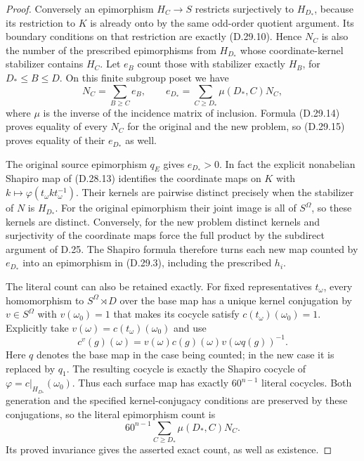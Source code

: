 \begin{proof}
Conversely an epimorphism $H_C\to S$ restricts
surjectively to $H_{D_*}$, because its restriction
to $K$ is already onto by the same odd-order
quotient argument.  Its boundary conditions on
that restriction are exactly
\textup{(D.29.10)}.  Hence $N_C$ is also the
number of the prescribed epimorphisms from
$H_{D_*}$ whose coordinate-kernel stabilizer
contains $H_C$.
Let $e_B$ count those with stabilizer exactly
$H_B$, for $D_*\leq B\leq D$.
On this finite subgroup poset we have
\[
 N_C=\sum_{B\geq C}e_B,\qquad
 e_{D_*}=\sum_{C\geq D_*}\mu(D_*,C)N_C,
 \tag{D.29.15}
\]
where $\mu$ is the inverse of the incidence matrix
of inclusion.  Formula \textup{(D.29.14)} proves
equality of every $N_C$ for the original and the
new problem, so \textup{(D.29.15)} proves equality
of their $e_{D_*}$ as well.

The original source epimorphism $q_E$ gives
$e_{D_*}>0$.  In fact the explicit nonabelian
Shapiro map of \textup{(D.28.13)} identifies
the coordinate maps on $K$ with
$k\mapsto\varphi(t_\omega k t_\omega^{-1})$.
Their kernels are pairwise distinct precisely
when the stabilizer of $N$ is $H_{D_*}$.
For the original epimorphism their joint image
is all of $S^\Omega$, so these kernels are
distinct.  Conversely, for the new problem
distinct kernels and surjectivity of the
coordinate maps force the full product by
the subdirect argument of D.25.
The Shapiro formula therefore turns each
new map counted by $e_{D_*}$ into an
epimorphism in \textup{(D.29.3)}, including
the prescribed $h_i$.

The literal count can also be retained exactly.
For fixed representatives $t_\omega$, every
homomorphism to $S^\Omega\rtimes D$ over the
base map has a unique kernel conjugation by
$v\in S^\Omega$ with $v(\omega_0)=1$
that makes its cocycle satisfy
$c(t_\omega)(\omega_0)=1$.
Explicitly take
$v(\omega)=c(t_\omega)(\omega_0)$ and use
\[
 c^v(g)(\omega)=v(\omega)c(g)(\omega)
                         v(\omega q(g))^{-1}.
 \tag{D.29.16}
\]
Here $q$ denotes the base map in the case being
counted; in the new case it is replaced by $q_1$.
The resulting cocycle is exactly the Shapiro
cocycle of $\varphi=c|_{H_{D_*}}(\omega_0)$.
Thus each surface map has exactly $60^{n-1}$
literal cocycles.  Both generation and the
specified kernel-conjugacy conditions are
preserved by these conjugations, so the
literal epimorphism count is
\[
                 60^{n-1}
                 \sum_{C\geq D_*}\mu(D_*,C)N_C.
 \tag{D.29.17}
\]
Its proved invariance gives the asserted exact
count, as well as existence.


\end{proof}
